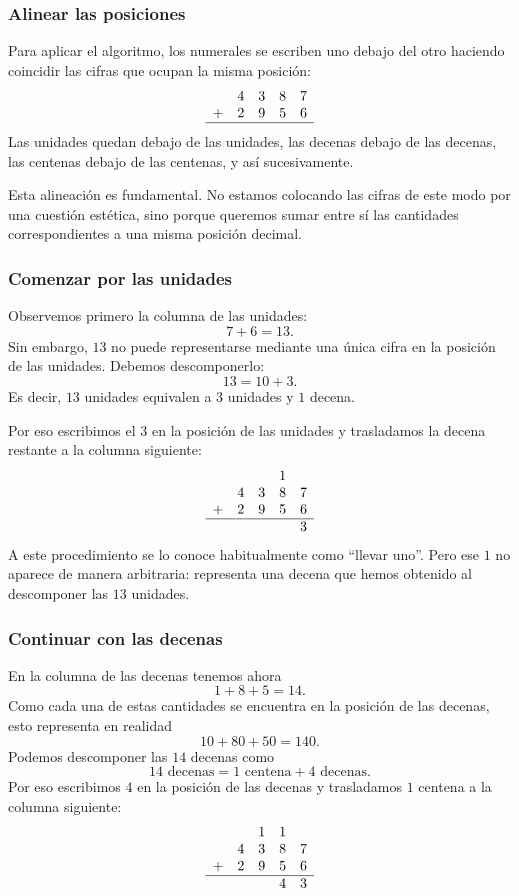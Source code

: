 \subsubsection*{Alinear las posiciones}

Para aplicar el algoritmo, los numerales se escriben uno debajo del otro haciendo coincidir las cifras que ocupan la misma posición:
\[
\begin{array}{rrrrr}
 & 4 & 3 & 8 & 7\\
+& 2 & 9 & 5 & 6\\
\hline
\end{array}
\]
Las unidades quedan debajo de las unidades, las decenas debajo de las decenas, las centenas debajo de las centenas, y así sucesivamente.

Esta alineación es fundamental. No estamos colocando las cifras de este modo por una cuestión estética, sino porque queremos sumar entre sí las cantidades correspondientes a una misma posición decimal.

\subsubsection*{Comenzar por las unidades}

Observemos primero la columna de las unidades:
\[
7+6=13.
\]
Sin embargo, \(13\) no puede representarse mediante una única cifra en la posición de las unidades. Debemos descomponerlo:
\[
13=10+3.
\]
Es decir, \(13\) unidades equivalen a \(3\) unidades y \(1\) decena.

Por eso escribimos el \(3\) en la posición de las unidades y trasladamos la decena restante a la columna siguiente:
\[
\begin{array}{rrrrr}
 &   &   & 1 &  \\
 & 4 & 3 & 8 & 7\\
+& 2 & 9 & 5 & 6\\
\hline
 &   &   &   & 3
\end{array}
\]
A este procedimiento se lo conoce habitualmente como ``llevar uno''. Pero ese \(1\) no aparece de manera arbitraria: representa una decena que hemos obtenido al descomponer las \(13\) unidades.

\subsubsection*{Continuar con las decenas}

En la columna de las decenas tenemos ahora
\[
1+8+5=14.
\]
Como cada una de estas cantidades se encuentra en la posición de las decenas, esto representa en realidad
\[
10+80+50=140.
\]
Podemos descomponer las \(14\) decenas como
\[
14\text{ decenas}=1\text{ centena}+4\text{ decenas}.
\]
Por eso escribimos \(4\) en la posición de las decenas y trasladamos \(1\) centena a la columna siguiente:
\[
\begin{array}{rrrrr}
 &   & 1 & 1 &  \\
 & 4 & 3 & 8 & 7\\
+& 2 & 9 & 5 & 6\\
\hline
 &   &   & 4 & 3
\end{array}
\]


